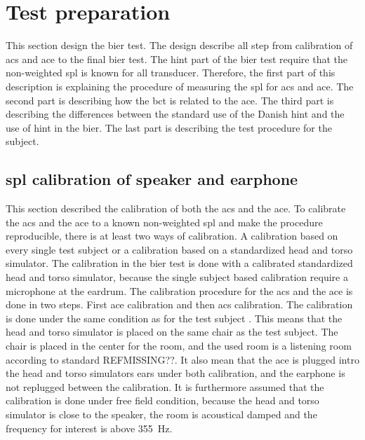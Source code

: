 


\section{Test preparation}
This section design the \gls{bier} test. The design describe all step from calibration of \gls{acs} and  \gls{ace} to the final \gls{bier} test. The \gls{hint} part of the \gls{bier} test require that the non-weighted \gls{spl} is known for all transducer. Therefore, the first part of this description is explaining the procedure of measuring the \gls{spl} for \gls{acs} and \gls{ace}. The second part is describing how the \gls{bct} is related to the \gls{ace}. The third part is describing the differences between the standard use of the Danish \gls{hint} and the use of \gls{hint} in the \gls{bier}. The last part is describing the test procedure for the subject. 





\subsection{\gls{spl} calibration of speaker and earphone}
This section described the calibration of both the \gls{acs} and the \gls{ace}. To calibrate the \gls{acs} and the \gls{ace} to a known non-weighted \gls{spl} and make the procedure reproducible, there is at least two ways of calibration. A calibration based on every single test subject or a calibration based on a standardized head and torso simulator. The calibration in the \gls{bier} test is done with a calibrated standardized head and torso simulator, because the single subject based calibration require a microphone at the eardrum. The calibration procedure for the \gls{acs} and the \gls{ace} is done in two steps. First \gls{ace} calibration and then \gls{acs} calibration. The calibration is done under the same condition as for the test subject . This means that the head and torso simulator is placed on the same chair as the test subject. The chair is placed in the center for the room, and the used room is a listening room according to standard REFMISSING??. It also mean that the \gls{ace} is plugged intro the head and torso simulators ears under both calibration, and the earphone is not replugged between the calibration. It is furthermore assumed that the calibration is done under free field condition, because the head and torso simulator is close to the speaker, the room is acoustical damped and the frequency for interest is above \SI{355}{\hertz}. 

